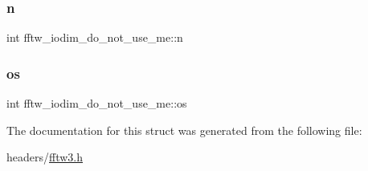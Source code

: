 \subsubsection{\texorpdfstring{n}{n}}
{\footnotesize\ttfamily int fftw\+\_\+iodim\+\_\+do\+\_\+not\+\_\+use\+\_\+me\+::n}

\mbox{\label{structfftw__iodim__do__not__use__me_acff6a6b2225f610d3bee5380e801abb4}} 
\subsubsection{\texorpdfstring{os}{os}}
{\footnotesize\ttfamily int fftw\+\_\+iodim\+\_\+do\+\_\+not\+\_\+use\+\_\+me\+::os}



The documentation for this struct was generated from the following file\+:\begin{DoxyCompactItemize}
\item 
headers/\hyperlink{fftw3_8h}{fftw3.\+h}\end{DoxyCompactItemize}
